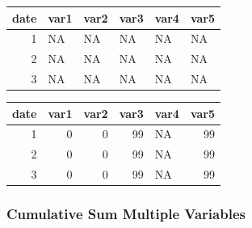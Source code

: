 \documentclass[
]{book}
\newenvironment{Shaded}{\begin{snugshade}}{\end{snugshade}}
\newcommand{\CommentTok}[1]{\textcolor[rgb]{0.56,0.35,0.01}{\textit{#1}}}
\newcommand{\DecValTok}[1]{\textcolor[rgb]{0.00,0.00,0.81}{#1}}
\newcommand{\KeywordTok}[1]{\textcolor[rgb]{0.13,0.29,0.53}{\textbf{#1}}}
\newcommand{\NormalTok}[1]{#1}
\newcommand{\OperatorTok}[1]{\textcolor[rgb]{0.81,0.36,0.00}{\textbf{#1}}}
\newcommand{\StringTok}[1]{\textcolor[rgb]{0.31,0.60,0.02}{#1}}
\begin{document}
\begin{table}[!h]
\centering
\begin{tabular}{r|l|l|l|l|l}
\hline
date & var1 & var2 & var3 & var4 & var5\\
\hline
\rowcolor{gray!6}  1 & NA & NA & NA & NA & NA\\
\hline
2 & NA & NA & NA & NA & NA\\
\hline
\rowcolor{gray!6}  3 & NA & NA & NA & NA & NA\\
\hline
\end{tabular}
\end{table}

\begin{Shaded}
\end{Shaded}

\begin{table}[!h]
\centering
\begin{tabular}{r|r|r|r|l|r}
\hline
date & var1 & var2 & var3 & var4 & var5\\
\hline
\rowcolor{gray!6}  1 & 0 & 0 & 99 & NA & 99\\
\hline
2 & 0 & 0 & 99 & NA & 99\\
\hline
\rowcolor{gray!6}  3 & 0 & 0 & 99 & NA & 99\\
\hline
\end{tabular}
\end{table}

\hypertarget{cumulative-sum-multiple-variables}{%
\subsubsection{Cumulative Sum Multiple Variables}\label{cumulative-sum-multiple-variables}}
\end{document}
